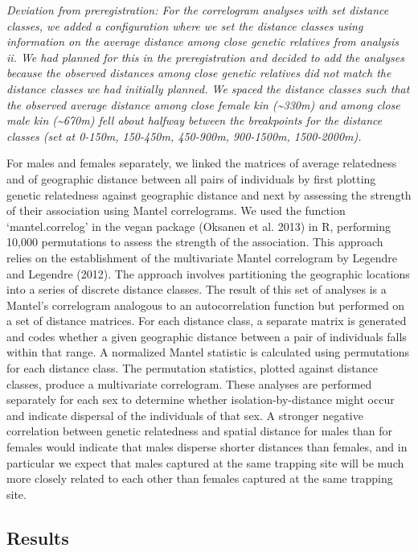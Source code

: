 \documentclass[]{article}
\begin{document}
\emph{Deviation from preregistration: For the correlogram analyses with
set distance classes, we added a configuration where we set the distance
classes using information on the average distance among close genetic
relatives from analysis ii. We had planned for this in the
preregistration and decided to add the analyses because the observed
distances among close genetic relatives did not match the distance
classes we had initially planned. We spaced the distance classes such
that the observed average distance among close female kin
(\textasciitilde{}330m) and among close male kin (\textasciitilde{}670m)
fell about halfway between the breakpoints for the distance classes (set
at 0-150m, 150-450m, 450-900m, 900-1500m, 1500-2000m).}

For males and females separately, we linked the matrices of average
relatedness and of geographic distance between all pairs of individuals
by first plotting genetic relatedness against geographic distance and
next by assessing the strength of their association using Mantel
correlograms. We used the function `mantel.correlog' in the vegan
package (Oksanen et al. 2013) in R, performing 10,000 permutations to
assess the strength of the association. This approach relies on the
establishment of the multivariate Mantel correlogram by Legendre and
Legendre (2012). The approach involves partitioning the geographic
locations into a series of discrete distance classes. The result of this
set of analyses is a Mantel's correlogram analogous to an
autocorrelation function but performed on a set of distance matrices.
For each distance class, a separate matrix is generated and codes
whether a given geographic distance between a pair of individuals falls
within that range. A normalized Mantel statistic is calculated using
permutations for each distance class. The permutation statistics,
plotted against distance classes, produce a multivariate correlogram.
These analyses are performed separately for each sex to determine
whether isolation-by-distance might occur and indicate dispersal of the
individuals of that sex. A stronger negative correlation between genetic
relatedness and spatial distance for males than for females would
indicate that males disperse shorter distances than females, and in
particular we expect that males captured at the same trapping site will
be much more closely related to each other than females captured at the
same trapping site.

\newpage

\hypertarget{results}{%
\subsection{Results}\label{results}}
\end{document}
